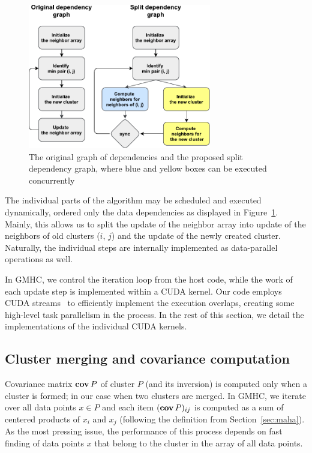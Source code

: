 \begin{figure}[t]
\centering
	\includegraphics[width=8cm]{Mahalanobis/img/dependency-graph}
	\caption{The original graph of dependencies and the proposed split dependency graph, where blue and yellow boxes can be executed concurrently}
	\label{fig:dep-graph}
\end{figure}

The individual parts of the algorithm may be scheduled and executed dynamically, ordered only the data dependencies as displayed in Figure~\ref{fig:dep-graph}.
Mainly, this allows us to split the update of the neighbor array into update of the neighbors of old clusters ($i$, $j$) and the update of the newly created cluster.
Naturally, the individual steps are internally implemented as data-parallel operations as well.

In GMHC, we control the iteration loop from the host code, while the work of each update step is implemented within a CUDA kernel.
Our code employs CUDA streams~\cite{cuda} to efficiently implement the execution overlaps, creating some high-level task parallelism in the process.
In the rest of this section, we detail the implementations of the individual CUDA kernels.


\subsection{Cluster merging and covariance computation}

Covariance matrix $\operatorname{\textbf{cov}} P$ of cluster $P$ (and its inversion) is computed only when a cluster is formed; in our case when two clusters are merged.
In GMHC, we iterate over all data points $x \in P$ and each item $(\operatorname{\textbf{cov}} P)_{ij}$ is computed as a sum of centered products of $x_i$ and $x_j$ (following the definition from Section~\ref{sec:maha}).
As the most pressing issue, the performance of this process depends on fast finding of data points $x$ that belong to the cluster in the array of all data points.

